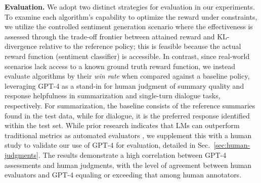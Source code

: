 \textbf{Evaluation.} We adopt two distinct strategies for evaluation in our experiments. To examine each algorithm's capability to optimize the reward under constraints, we utilize the controlled sentiment generation scenario where the effectiveness is assessed through the trade-off frontier between attained reward and KL-divergence relative to the reference policy; this is feasible because the actual reward function (sentiment classifier) is accessible. In contrast, since real-world scenarios lack access to a known ground truth reward function, we instead evaluate algorithms by their \textit{win rate} when compared against a baseline policy, leveraging GPT-4 as a stand-in for human judgment of summary quality and response helpfulness in summarization and single-turn dialogue tasks, respectively. For summarization, the baseline consists of the reference summaries found in the test data, while for dialogue, it is the preferred response identified within the test set. While prior research indicates that LMs can outperform traditional metrics as automated evaluators \citep{Chen2023ExploringTU}, we supplement this with a human study to validate our use of GPT-4 for evaluation, detailed in Sec.~\ref{sec:human-judgments}. The results demonstrate a high correlation between GPT-4 assessments and human judgments, with the level of agreement between human evaluators and GPT-4 equaling or exceeding that among human annotators.

